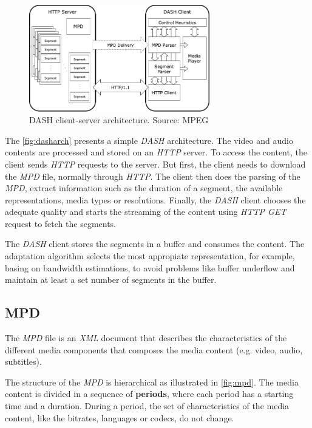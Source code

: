\begin{figure}[h]
  \centering
  \includegraphics[width=0.7\textwidth]{img/dasharch.png}
  \caption{DASH client-server architecture. Source: MPEG \cite{ios1}}
  \label{fig:dasharch}
\end{figure}

The \autoref{fig:dasharch} presents a simple \textit{DASH} architecture. The video and audio
contents are processed and stored on an \textit{HTTP} server. To access the content, the client
sends \textit{HTTP} requests to the server. But first, the client needs to download the 
\textit{MPD} file, normally through \textit{HTTP}. The client then does the
parsing of the \textit{MPD}, extract information such as the duration of a segment, 
the available representations, media types or 
resolutions. Finally, the \textit{DASH} client chooses the adequate quality and starts the 
streaming of the content using \textit{HTTP GET} request to fetch the segments.

The \textit{DASH} client stores the segments in a buffer and consumes the content. The adaptation
algorithm selects the most appropiate representation, for example, basing on bandwidth estimations,
to avoid problems like buffer underflow and maintain at 
least a set number of segments in the buffer.

\subsection{MPD}
\label{sec:mpd}
The \textit{MPD} file is an \textit{XML} document that describes the characteristics
of the different media components that composes the media content (e.g. video, audio, subtitles).

The structure of the \textit{MPD} is hierarchical as illustrated in \autoref{fig:mpd}. The media content is divided in a sequence of
\textbf{periods}, where each period has a starting time and a duration. During a period, the set of characteristics
of the media content, like the bitrates, languages or codecs, do not change.

